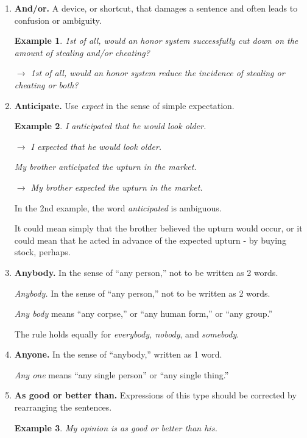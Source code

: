 \documentclass{book}
\numberwithin{equation}{section}
\newtheorem{example}{Example}[chapter]
\begin{document}
\begin{enumerate}
    When, however, more than 2 are involved but each is considered  individually, \textit{between} is preferred: ``an agreement between the 6 heirs.''
    \item \textbf{And/or.} A device, or shortcut, that damages a sentence and often leads to confusion or ambiguity.
    \begin{example}
        1st of all, would an honor system successfully cut down on the amount of stealing and/or cheating?
        
        $\to$ 1st of all, would an honor system reduce the incidence of stealing or cheating or both?
    \end{example}
    \item \textbf{Anticipate.} Use \textit{expect} in the sense of simple expectation.
    \begin{example}
        I anticipated that he would look older.
        
        $\to$ I expected that he would look older.
        
        My brother anticipated the upturn in the market.
        
        $\to$ My brother expected the upturn in the market.
    \end{example}
    In the 2nd example, the word \textit{anticipated} is ambiguous.
    
    It could mean simply that the brother believed the upturn would occur, or it could mean that he acted in advance of the expected upturn - by buying stock, perhaps.
    \item \textbf{Anybody.} In the sense of ``any person,'' not to be written as 2 words.
    
    \textit{Anybody.} In the sense of ``any person,'' not to be written as 2 words.
    
    \textit{Any body} means ``any corpse,'' or ``any human form,'' or ``any group.''
    
    The rule holds equally for \textit{everybody, nobody}, and \textit{somebody}.
    \item \textbf{Anyone.} In the sense of ``anybody,'' written as 1 word.
    
    \textit{Any one} means ``any single person'' or ``any single thing.''
    \item \textbf{As good or better than.} Expressions of this type should be corrected by rearranging the sentences.
    \begin{example}
        My opinion is as good or better than his.
        

\end{example}
\end{enumerate}
\end{document}
